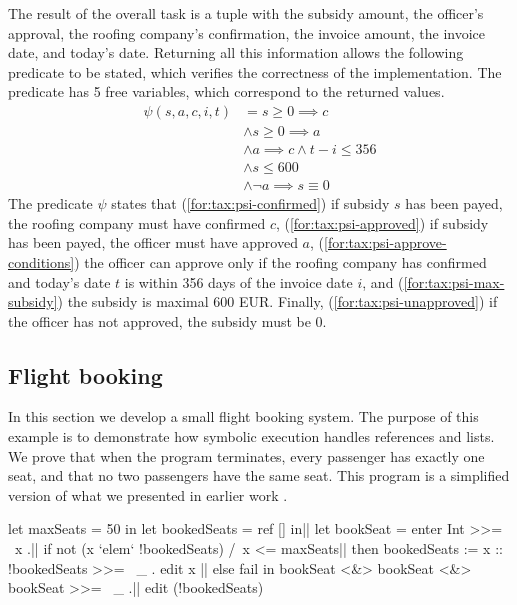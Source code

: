 The result of the overall task is a tuple with the subsidy amount, the officer's approval, the roofing company's confirmation, the invoice amount, the invoice date, and today's date.
Returning all this information allows the following predicate to be stated, which verifies the correctness of the implementation.
The predicate has 5 free variables, which correspond to the returned values.
\setcounter{equation}{0}
\begin{align}
\psi(s,a,c,i,t)
   & =      s \geq 0 \implies c \label{for:tax:psi-confirmed}
\\ & \wedge s \geq 0 \implies a \label{for:tax:psi-approved}
\\ & \wedge a \implies c \wedge t - i \leq 356 \label{for:tax:psi-approve-conditions}
\\ & \wedge s \leq 600 \label{for:tax:psi-max-subsidy}
\\ & \wedge \lnot a \implies s \equiv 0 \label{for:tax:psi-unapproved}
\end{align}
The predicate $\psi$ states that (\ref{for:tax:psi-confirmed}) if subsidy $s$ has been payed, the roofing company must have confirmed $c$, (\ref{for:tax:psi-approved}) if subsidy has been payed, the officer must have approved $a$, (\ref{for:tax:psi-approve-conditions}) the officer can approve only if the roofing company has confirmed and today's date $t$ is within 356 days of the invoice date $i$, and (\ref{for:tax:psi-max-subsidy}) the subsidy is maximal 600 EUR.
Finally, (\ref{for:tax:psi-unapproved}) if the officer has not approved, the subsidy must be 0.



\subsection{Flight booking}

In this section we develop a small flight booking system.
The purpose of this example is to demonstrate how symbolic execution handles references and lists.
We prove that when the program terminates, every passenger has exactly one seat, and that no two passengers have the same seat.
This program is a simplified version of what we presented in earlier work \cite{Steenvoorden2019}.

\begin{TASK}[float=ht
            ,numbers=right
            ,caption=Flight booking.
            ,label=lst:flight-booking
            ]
  let maxSeats = 50 in
  let bookedSeats = ref [] in|\label{lst:flight:make-ref}|
  let bookSeat = enter Int >>= \ x .|\label{lst:flight:enter-seat-number}|
    if not (x `elem` !bookedSeats) /\ x <= maxSeats|\label{lst:flight:guard-invalid-seats}|
      then bookedSeats := x :: !bookedSeats >>= \ _ . edit x |\label{lst:flight:update-seats}|
      else fail in
  bookSeat <&> bookSeat <&> bookSeat >>= \ _ .|\label{lst:flight:main-expression}|
  edit (!bookedSeats)
\end{TASK}

